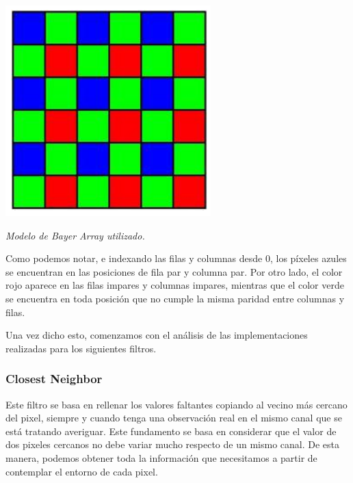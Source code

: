 	\par 
	\begin{center}
		\includegraphics[scale=0.4]{./img/bayerarray.png}
		\par 
		\footnotesize\textit{Modelo de Bayer Array utilizado.}
	\end{center}
	\par 
	
Como podemos notar, e indexando las filas y columnas desde 0, los píxeles azules se encuentran en las posiciones de fila par y columna par. Por otro lado, el color rojo aparece en las filas impares y columnas impares, mientras que el color verde se encuentra en toda posición que no cumple la misma paridad entre columnas y filas.
\par 

\vspace{\baselineskip}

Una vez dicho esto, comenzamos con el análisis de las implementaciones realizadas para los siguientes filtros.
	
\subsubsection{Closest Neighbor}

Este filtro se basa en rellenar los valores faltantes copiando al vecino más
cercano del pixel, siempre y cuando tenga una observación real en el mismo canal que se está tratando averiguar. Este fundamento se basa en considerar que el valor de dos pixeles cercanos no debe variar mucho respecto de un mismo canal. De esta manera, podemos obtener toda la información que necesitamos a partir de contemplar el entorno de cada pixel.

\vspace{\baselineskip}

